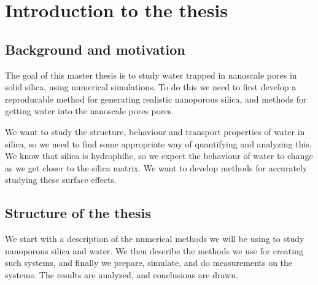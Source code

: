 \chapter*{Introduction to the thesis}%
%

\section*{Background and motivation}
%
The goal of this master thesis is to study water trapped in nanoscale pores in solid silica, using numerical simulations. To do this we need to first develop a reproducable method for generating realistic nanoporous silica, and methods for getting water into the nanoscale pores pores. 

We want to study the structure, behaviour and transport properties of water in silica, so we need to find some appropriate way of quantifying and analyzing this. We know that silica is hydrophilic, so we expect the behaviour of water to change as we get closer to the silica matrix. We want to develop methods for accurately studying these surface effects.



\section*{Structure of the thesis}
%
We start with a description of the numerical methods we will be using to study nanoporous silica and water. We then describe the methods we use for creating such systems, and finally we prepare, simulate, and do measurements on the systems. The results are analyzed, and conclusions are drawn.

% 





